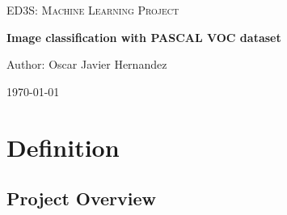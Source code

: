 \documentclass[10pt,a4paper]{article}
\begin{document}

\begin{titlepage}
	\centering
	\vspace{1cm}
	{\scshape\Large ED3S: Machine Learning Project \par}
	\vspace{1.5cm}
	{\huge\bfseries Image classification with PASCAL VOC dataset \par}
	\vspace{1.5cm}
	{\Large Author: Oscar Javier Hernandez\par}
	\vfill

	{\large \today\par}
\end{titlepage}

\section{Definition}
\subsection{Project Overview}\label{sec: overview}
%
\end{document}
